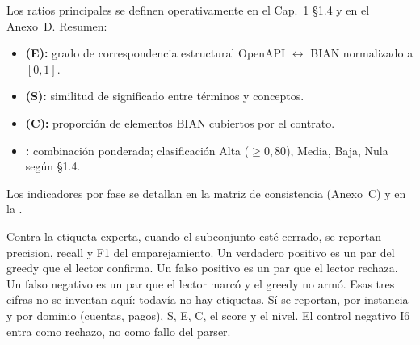 Los ratios principales se definen operativamente en el Cap.~1 §1.4 y en el Anexo~D. Resumen:

\begin{itemize}
  \item \textbf{\StructuralScore{} (E):} grado de correspondencia estructural OpenAPI $\leftrightarrow$
        BIAN normalizado a $[0,1]$.
  \item \textbf{\SemanticScore{} (S):} similitud de significado entre términos y conceptos.
  \item \textbf{\CoverageScore{} (C):} proporción de elementos BIAN cubiertos por el contrato.
  \item \textbf{\AlignmentScore{}:} combinación ponderada; clasificación Alta ($\geq 0{,}80$),
        Media, Baja, Nula según §1.4.
\end{itemize}

Los indicadores por fase se detallan en la matriz de consistencia (Anexo~C) y en la
.

Contra la etiqueta experta, cuando el subconjunto esté cerrado, se reportan precision, recall
y F1 del emparejamiento. Un verdadero positivo es un par del greedy que el lector confirma.
Un falso positivo es un par que el lector rechaza. Un falso negativo es un par que el lector
marcó y el greedy no armó. Esas tres cifras no se inventan aquí: todavía no hay etiquetas.
Sí se reportan, por instancia y por dominio (cuentas, pagos), S, E, C, el score y el nivel.
El control negativo I6 entra como rechazo, no como fallo del parser.
